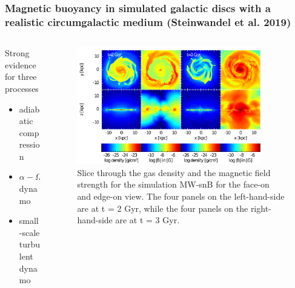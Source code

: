 \documentclass[10pt,aspectratio=169]{beamer}
\begin{document}
\begin{frame}
	\frametitle{Magnetic buoyancy in simulated galactic discs with a realistic circumgalactic medium (Steinwandel et al. 2019)}
	\begin{columns}
		\begin{column}{0.45\textwidth}
				Strong evidence for three processes
			\begin{itemize}
				\item adiabatic compression
				\item $\alpha-\Omega$ dynamo
				\item small-scale turbulent dynamo
			\end{itemize}
		\end{column}
		\begin{column}{0.55\textwidth}
			\begin{figure}
				\includegraphics[width=8cm]{./images/test_seeding.pdf}
				\caption{Slice through the gas density and the magnetic field strength for the simulation MW-snB for the face-on and edge-on view. The four panels on the left-hand-side are at t = 2 Gyr, while the four panels on the right-hand-side are at t = 3 Gyr.}
			\end{figure}
		\end{column}
	\end{columns}
\end{frame}
\end{document}
